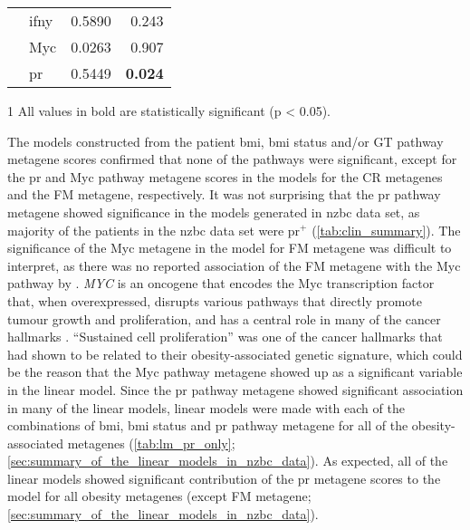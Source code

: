 \begin{table}[htpb]
\begin{threeparttable}
\begin{tabular}{llrr}
                                                                       & \gls{ifny} & 0.5890  & 0.243\\
                                                                       & Myc        & 0.0263  & 0.907\\
                                                                       & \gls{pr}   & 0.5449  & \textbf{0.024}\\
			\hline
			\hline
		\end{tabular}
		\begin{tablenotes}
			\begin{footnotesize}
				\item [1] All values in bold are statistically significant (p \textless{} 0.05).
			\end{footnotesize}
		\end{tablenotes}
	\end{threeparttable}
\end{table}

The models constructed from the patient \gls{bmi}, \gls{bmi} status and/or GT pathway metagene scores confirmed that none of the pathways were significant, except for the \gls{pr} and Myc pathway metagene scores in the models for the CR metagenes and the FM metagene, respectively.
It was not surprising that the \gls{pr} pathway metagene showed significance in the models generated in \gls{nzbc} data set, as majority of the patients in the \gls{nzbc} data set were \gls{pr}$^+$ (\cref{tab:clin_summary}).
The significance of the Myc metagene in the model for FM metagene was difficult to interpret, as there was no reported association of the FM metagene with the Myc pathway by \citet{Fuentes-Mattei2014}.
\textit{MYC} is an oncogene that encodes the Myc transcription factor that, when overexpressed, disrupts various pathways that directly promote tumour growth and proliferation, and has a central role in many of the cancer hallmarks \citep{Coller2000,Hanahan2000}.
``Sustained cell proliferation'' was one of the cancer hallmarks that \citet{Fuentes-Mattei2014} had shown to be related to their obesity-associated genetic signature, which could be the reason that the Myc pathway metagene showed up as a significant variable in the linear model.
Since the \gls{pr} pathway metagene showed significant association in many of the linear models, linear models were made with each of the combinations of \gls{bmi}, \gls{bmi} status and \gls{pr} pathway metagene for all of the obesity-associated metagenes (\cref{tab:lm_pr_only}; \cref{sec:summary_of_the_linear_models_in_nzbc_data}).
As expected, all of the linear models showed significant contribution of the \gls{pr} metagene scores to the model for all obesity metagenes (except FM metagene; \cref{sec:summary_of_the_linear_models_in_nzbc_data}).

